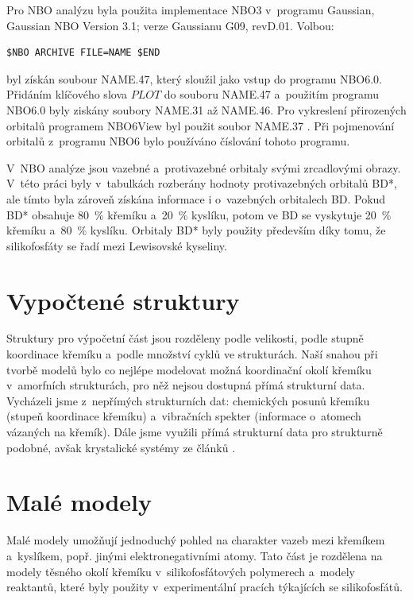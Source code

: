 \documentclass[
digital, %
table,   %
nolof,     %
nolot,     %
oneside,
]{fithesis3}
\begin{document}
Pro NBO analýzu byla použita implementace NBO3 v~programu Gaussian, Gaussian NBO Version 3.1; verze Gaussianu G09, revD.01. Volbou: \begin{lstlisting}[frame=single]
$NBO ARCHIVE FILE=NAME $END
\end{lstlisting}
byl získán soubour NAME.47, který sloužil jako vstup do programu NBO6.0. Přidáním klíčového slova $PLOT$ do souboru NAME.47 a~použitím programu NBO6.0 byly ziskány soubory NAME.31 až NAME.46. Pro vykreslení přirozených orbitalů programem NBO6View byl použit soubor NAME.37 \cite{doi:10.1002/jcc.23266}. Při pojmenování orbitalů z~programu NBO6 bylo používáno číslování tohoto programu.

V~NBO analýze jsou vazebné a~protivazebné orbitaly svými zrcadlovými obrazy. V~této práci byly v~tabulkách rozberány hodnoty protivazebných orbitalů BD*, ale tímto byla zároveň získána informace i o~vazebných orbitalech BD. Pokud BD* obsahuje 80~\% křemíku a~20~\% kyslíku, potom ve BD se vyskytuje 20~\% křemíku a~80~\% kyslíku. Orbitaly BD* byly použity především díky tomu, že silikofosfáty se řadí mezi Lewisovské kyseliny.

\section{Vypočtené struktury}\label{vypoctene_struktury}
Struktury pro výpočetní část jsou rozděleny podle velikosti, podle stupně koordinace křemíku a~podle množství cyklů ve strukturách. Naší snahou při tvorbě modelů bylo co nejlépe modelovat možná koordinační okolí křemíku v~amorfních strukturách, pro něž nejsou dostupná přímá strukturní data. Vycházeli jsme z~nepřímých strukturních dat: chemických posunů křemíku (stupeň koordinace křemíku) a~vibračních spekter (informace o~atomech vázaných na křemík). Dále jsme využili přímá strukturní data pro strukturně podobné, avšak krystalické systémy ze článků \cite{C3NJ00721A, rtg_4_pinkas}.

\section{Malé modely}
Malé modely umožňují jednoduchý pohled na charakter vazeb mezi křemíkem a~kyslíkem, popř. jinými elektronegativními atomy. Tato část je rozdělena na modely těsného okolí křemíku v~silikofosfátových polymerech a~modely reaktantů, které byly použity v~experimentální pracích týkajících se silikofosfátů.
\end{document}
